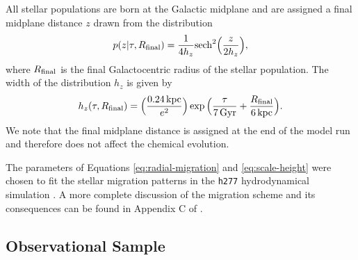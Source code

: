 \documentclass[twocolumn,twocolappendix,linenumbers]{aastex631}
\begin{document}
All stellar populations are born at the Galactic midplane and are assigned a final midplane distance $z$ drawn from the distribution
\begin{equation}
    p(z|\tau,R_{\rm final}) = \frac{1}{4 h_z} {\rm sech}^2\Big(\frac{z}{2 h_z}\Big),
    \label{eq:sech-pdf}
\end{equation}
where $R_{\rm final}$ is the final Galactocentric radius of the stellar population. The width of the distribution $h_z$ is given by
\begin{equation}
    h_z(\tau,R_{\rm final}) = \Big(\frac{0.24\,{\rm kpc}}{e^2}\Big) \exp\Big(\frac{\tau}{7\,{\rm Gyr}} + \frac{R_{\rm final}}{6\,{\rm kpc}}\Big).
    \label{eq:scale-height}
\end{equation}
We note that the final midplane distance is assigned at the end of the model run and therefore does not affect the chemical evolution.

The parameters of Equations \ref{eq:radial-migration} and \ref{eq:scale-height} were chosen to fit the stellar migration patterns in the {\tt h277} hydrodynamical simulation \citep{christensen_implementing_2012}. A more complete discussion of the migration scheme and its consequences can be found in Appendix C of \citet{dubay_galactic_2024}.

\subsection{Observational Sample}
\label{sec:observational-sample}
\end{document}
